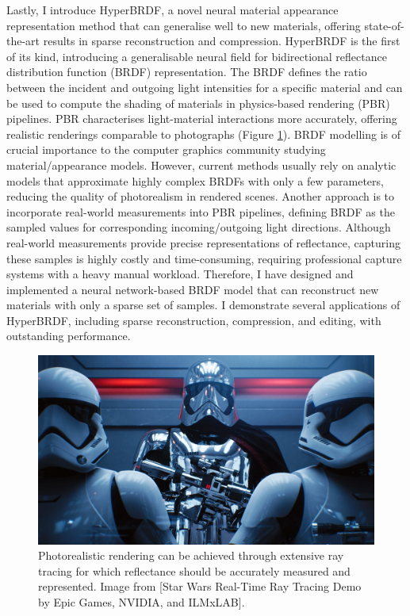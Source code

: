Lastly, I introduce HyperBRDF, a novel neural material appearance representation method that can generalise well to new materials, offering state-of-the-art results in sparse reconstruction and compression. HyperBRDF is the first of its kind, introducing a generalisable neural field for bidirectional reflectance distribution function (BRDF) representation. The BRDF defines the ratio between the incident and outgoing light intensities for a specific material and can be used to compute the shading of materials in physics-based rendering (PBR) pipelines. PBR characterises light-material interactions more accurately, offering realistic renderings comparable to photographs (Figure \ref{fig:brdf-intro}). BRDF modelling is of crucial importance to the computer graphics community studying material/appearance models. However, current methods usually rely on analytic models that approximate highly complex BRDFs with only a few parameters, reducing the quality of photorealism in rendered scenes. Another approach is to incorporate real-world measurements into PBR pipelines, defining BRDF as the sampled values for corresponding incoming/outgoing light directions. Although real-world measurements provide precise representations of reflectance, capturing these samples is highly costly and time-consuming, requiring professional capture systems with a heavy manual workload. Therefore, I have designed and implemented a neural network-based BRDF model that can reconstruct new materials with only a sparse set of samples. I demonstrate several applications of HyperBRDF, including sparse reconstruction, compression, and editing, with outstanding performance.

\begin{figure}[ht]
  \centering

    \includegraphics[width=\linewidth]{Images/StarWars-RayTracing.jpeg}

   \caption{Photorealistic rendering can be achieved through extensive ray tracing for which reflectance should be accurately measured and represented. Image from [Star Wars Real-Time Ray Tracing Demo by Epic Games, NVIDIA, and ILMxLAB].}
   \label{fig:brdf-intro}
\end{figure}



